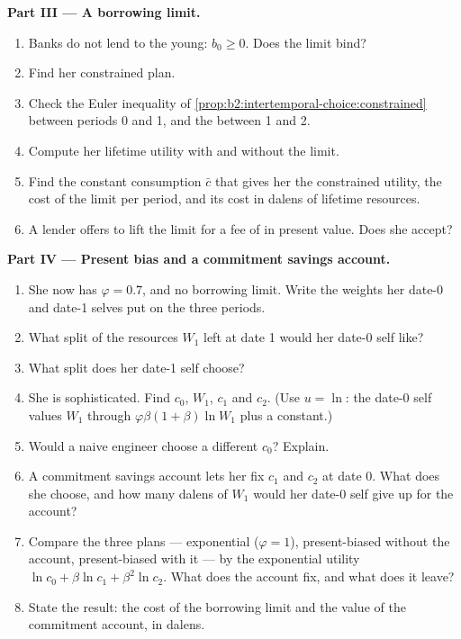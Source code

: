 \begin{problem}
\medskip
\noindent\textbf{Part III --- A borrowing limit.}
\begin{enumerate}[resume]
  \item Banks do not lend to the young: $b_0 \ge 0$. Does the limit bind?
  \item Find her constrained plan.
  \item Check the Euler inequality of \cref{prop:b2:intertemporal-choice:constrained} between periods
        0 and 1, and the  between 1 and 2.
  \item Compute her lifetime utility with and without the limit.
  \item Find the constant consumption $\bar c$ that gives her the constrained utility, the cost of the
        limit per period, and its cost in dalens of lifetime resources.
  \item A lender offers to lift the limit for a fee of  in present value. Does she accept?
\end{enumerate}

\medskip
\noindent\textbf{Part IV --- Present bias and a commitment savings account.}
\begin{enumerate}[resume]
  \item She now has $\varphi = 0.7$, and no borrowing limit. Write the weights her date-0 and date-1
        selves put on the three periods.
  \item What split of the resources $W_1$ left at date 1 would her date-0 self like?
  \item What split does her date-1 self choose?
  \item She is sophisticated. Find $c_0$, $W_1$, $c_1$ and $c_2$. (Use $u = \ln$: the date-0 self
        values $W_1$ through $\varphi\beta(1 + \beta)\ln W_1$ plus a constant.)
  \item Would a naive engineer choose a different $c_0$? Explain.
  \item A commitment savings account lets her fix $c_1$ and $c_2$ at date 0. What does she choose, and
        how many dalens of $W_1$ would her date-0 self give up for the account?
  \item Compare the three plans --- exponential ($\varphi = 1$), present-biased without the account,
        present-biased with it --- by the exponential utility $\ln c_0 + \beta\ln c_1 + \beta^2\ln c_2$.
        What does the account fix, and what does it leave?
  \item State the result: the cost of the borrowing limit and the value of the commitment account, in
        dalens.
\end{enumerate}
\end{problem}
